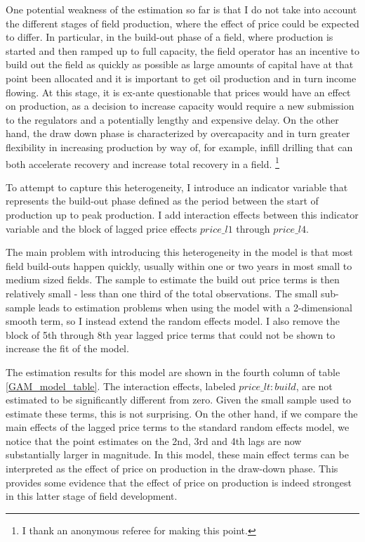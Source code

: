 \documentclass[12pt]{article}
\begin{document}
One potential weakness of the estimation so far is that I do not take into account the different stages of field production, where the effect of price could be expected to differ. 
In particular, in the build-out phase of a field, where production is started and then ramped up to full capacity, the field operator has an incentive to build out the field as quickly as possible as large amounts of capital have at that point been allocated and it is important to get oil production and in turn income flowing. At this stage, it is ex-ante questionable that prices would have an effect on production, as a decision to increase capacity would require a new submission to the regulators and a potentially lengthy and expensive delay. On the other hand, the draw down phase is characterized by overcapacity and in turn greater flexibility in increasing production by way of, for example, infill drilling that can both accelerate recovery and increase total recovery in a field. \footnote{I thank an anonymous referee for making this point.}

To attempt to capture this heterogeneity, I introduce an indicator variable that represents the build-out phase defined as the period between the start of production up to peak production. I add interaction effects between this indicator variable and the block of lagged price effects $price\_l1$ through $price\_l4$.

The main problem with introducing this heterogeneity in the model is that most field build-outs happen quickly, usually within one or two years in most small to medium sized fields. The sample to estimate the build out price terms is then relatively small - less than one third of the total observations. The small sub-sample leads to estimation problems when using the model with a 2-dimensional smooth term, so I instead extend the random effects model. I also remove the block of 5th through 8th year lagged price terms that could not be shown to increase the fit of the model.

The estimation results for this model are shown in the fourth column of table \ref{GAM_model_table}. The interaction effects, labeled $price\_lt:build$, are not estimated to be significantly different from zero. Given the small sample used to estimate these terms, this is not surprising. On the other hand, if we compare the main effects of the lagged price terms to the standard random effects model, we notice that the point estimates on the 2nd, 3rd and 4th lags are now substantially larger in magnitude. In this model, these main effect terms can be interpreted as the effect of price on production in the draw-down phase. This provides some evidence that the effect of price on production is indeed strongest in this latter stage of field development.
\end{document}
